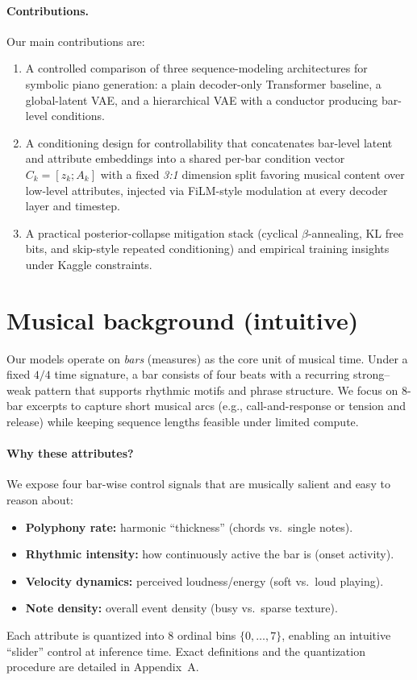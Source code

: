 \documentclass[10pt]{article}
\begin{document}
\paragraph{Contributions.}
Our main contributions are:
\begin{enumerate}[leftmargin=*,itemsep=0pt]
  \item A controlled comparison of three sequence-modeling architectures for symbolic piano generation: a plain decoder-only Transformer baseline, a global-latent VAE, and a hierarchical VAE with a conductor producing bar-level conditions.
  \item A conditioning design for controllability that concatenates bar-level latent and attribute embeddings into a shared per-bar condition vector $C_k=[z_k;A_k]$ with a fixed \emph{3:1} dimension split favoring musical content over low-level attributes, injected via FiLM-style modulation at every decoder layer and timestep.
  \item A practical posterior-collapse mitigation stack (cyclical $\beta$-annealing, KL free bits, and skip-style repeated conditioning) and empirical training insights under Kaggle constraints.
\end{enumerate}

\section{Musical background (intuitive)}
Our models operate on \emph{bars} (measures) as the core unit of musical time. Under a fixed $4/4$ time signature, a bar consists of four beats with a recurring strong--weak pattern that supports rhythmic motifs and phrase structure. We focus on 8-bar excerpts to capture short musical arcs (e.g., call-and-response or tension and release) while keeping sequence lengths feasible under limited compute.

\paragraph{Why these attributes?}
We expose four bar-wise control signals that are musically salient and easy to reason about:
\begin{itemize}[leftmargin=*,itemsep=0pt]
  \item \textbf{Polyphony rate:} harmonic ``thickness'' (chords vs.\ single notes).
  \item \textbf{Rhythmic intensity:} how continuously active the bar is (onset activity).
  \item \textbf{Velocity dynamics:} perceived loudness/energy (soft vs.\ loud playing).
  \item \textbf{Note density:} overall event density (busy vs.\ sparse texture).
\end{itemize}
Each attribute is quantized into 8 ordinal bins $\{0,\dots,7\}$, enabling an intuitive ``slider'' control at inference time. Exact definitions and the quantization procedure are detailed in Appendix~A.
\end{document}
